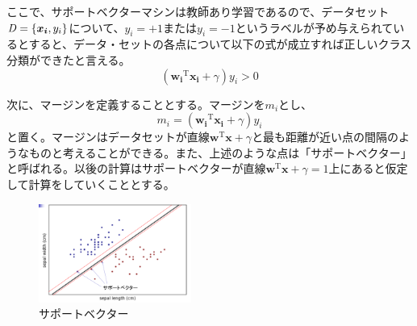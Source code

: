 ここで、サポートベクターマシンは教師あり学習であるので、データセット
${\it{D}} = \{\bm{x_i}, y_i\}$について、$y_i = +1$または$y_i = -1$というラベルが予め与えられているとすると、データ・セットの各点について以下の式が成立すれば正しいクラス分類ができたと言える。
\begin{equation}
  (\bm{w_i}^{\mathrm{T}}\bm{x_i} + \gamma)y_i > 0
\end{equation}

次に、マージンを定義することとする。マージンを$m_i$とし、
\begin{equation}
    m_i = (\bm{w_i}^{\mathrm{T}}\bm{x_i} + \gamma)y_i
 \end{equation}
と置く。マージンはデータセットが直線$\bm{w}^{\mathrm{T}}\bm{x} + \gamma$と最も距離が近い点の間隔のようなものと考えることができる。また、上述のような点は「サポートベクター」と呼ばれる。以後の計算はサポートベクターが直線$\bm{w}^{\mathrm{T}}\bm{x} + \gamma = 1$上にあると仮定して計算をしていくこととする。
\begin{figure}[h]
  \centering
  \includegraphics[width=5cm]{figure/section1/figure2.png}
  \caption{サポートベクター}
\end{figure}

